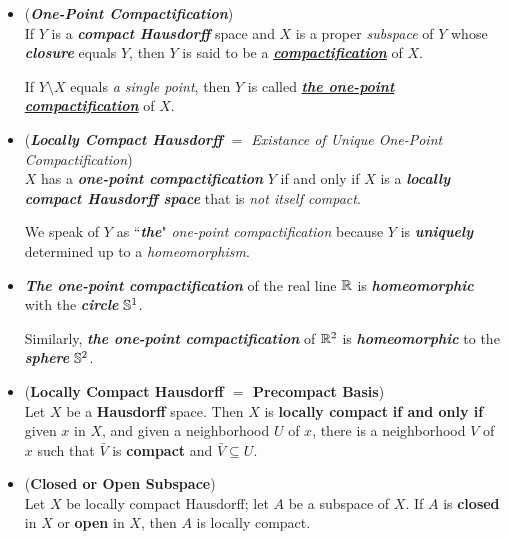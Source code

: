 \documentclass[11pt]{article}
\begin{document}
\begin{itemize}
\item \begin{definition} (\emph{\textbf{One-Point Compactification}})\\
If $Y$ is a \emph{\textbf{compact Hausdorff}} space and $X$ is a proper \emph{subspace} of $Y$ whose \emph{\textbf{closure}} equals $Y$, then $Y$ is said to be a \underline{\textbf{\emph{compactification}}} of $X$. 

If $Y\setminus X$ equals \emph{a single point}, then $Y$ is called \underline{\textbf{\emph{the one-point compactification}}} of $X$.
\end{definition}

\item \begin{remark} (\emph{\textbf{Locally Compact Hausdorff} $=$ Existance of Unique One-Point Compactification})\\
$X$ has a \emph{\textbf{one-point compactification}} $Y$ if and only if $X$ is a \emph{\textbf{locally compact Hausdorff space}} that is \emph{not itself compact}. 

We speak of $Y$ as ``\emph{\textbf{the}}" \emph{one-point compactification} because $Y$ is \emph{\textbf{uniquely}} determined up to a \emph{homeomorphism}.
\end{remark}

\item \begin{example}
\emph{\textbf{The one-point compactification}} of the real line ${\mathbb R}$ is \emph{\textbf{homeomorphic}} with the \emph{\textbf{circle}} ${\mathbb S}^1$.

Similarly, \emph{\textbf{the one-point compactification}} of ${\mathbb R}^2$ is \emph{\textbf{homeomorphic}} to the \emph{\textbf{sphere}} ${\mathbb S}^2$.
\end{example}

\item \begin{proposition} (\textbf{Locally Compact Hausdorff $=$ Precompact Basis}) \citep{munkres2000topology} \\
Let $X$ be a \textbf{Hausdorff} space. Then $X$ is \textbf{locally compact} \textbf{if and only if} given $x$ in $X$, and given a neighborhood $U$ of $x$, there is a neighborhood $V$ of $x$ such that $\bar{V}$ is \textbf{compact} and $\bar{V} \subseteq U$.
\end{proposition}

\item \begin{corollary} (\textbf{Closed or Open Subspace}) \citep{munkres2000topology} \\
Let $X$ be locally compact Hausdorff; let $A$ be a subspace of $X$. If $A$ is \textbf{closed} in $X$ or \textbf{open} in $X$, then $A$ is locally compact.
\end{corollary}


\end{itemize}
\end{document}
